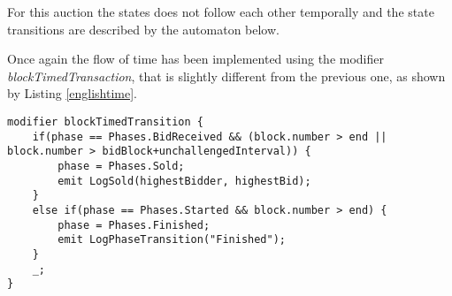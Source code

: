 \documentclass{article}
\begin{document}
For this auction the states does not follow each other temporally and the state transitions are described by the automaton below.
\begin{center}
\end{center}

Once again the flow of time has been implemented using the modifier \textit{blockTimedTransaction}, that is slightly different from the previous one, as shown by Listing \ref{englishtime}.

\begin{lstlisting}[language=Solidity, caption={Modifier used for modelling the time flow during an English auction, according to the automaton.},captionpos=b, label=englishtime]
 modifier blockTimedTransition {
    if(phase == Phases.BidReceived && (block.number > end || block.number > bidBlock+unchallengedInterval)) {
        phase = Phases.Sold; 
        emit LogSold(highestBidder, highestBid);
    }
    else if(phase == Phases.Started && block.number > end) {
        phase = Phases.Finished;
        emit LogPhaseTransition("Finished");
    }
    _;
}
\end{lstlisting}
\end{document}
